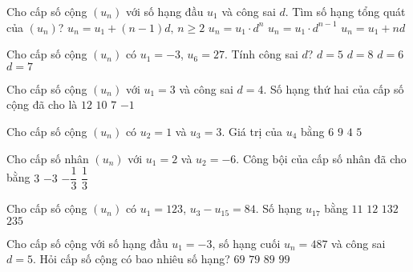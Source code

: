 \begin{ex}%
	Cho cấp số cộng $\left(u_n\right)$ với số hạng đầu $u_1$ và công sai $d$. Tìm số hạng tổng quát của $\left(u_n\right)$?
	\choice
		{\True  $u_n=u_1+\left( n-1 \right)d,\,n\ge 2$}
		{$u_n=u_1\cdot d^n$}
		{ $u_n=u_1\cdot d^{n-1}$}
		{$u_n=u_1+nd$}
\end{ex}
\begin{ex}%
	Cho cấp số cộng $\left(u_n\right)$ có $u_1=-3$, $u_6=27$. Tính công sai $d$?
	\choice
		{ $d=5$}
		{$d=8$}
		{\True $d=6$}
		{$d=7$}
\end{ex}
\begin{ex}%
	Cho cấp số cộng $\left(u_n\right)$ với $u_1=3$ và công sai $d=4$. Số hạng thứ hai của cấp số cộng đã cho là
	\choice
		{$12$}
		{$10$}
		{\True $7$}
		{$-1$}
\end{ex}
\begin{ex}%
	Cho cấp số cộng $\left(u_n\right)$ có $u_2=1$ và $u_3=3$. Giá trị của $u_4$ bằng
	\choice
		{ $6$}
		{$9$}
		{$4$}
		{\True $5$}
\end{ex}
\begin{ex}%
	Cho cấp số nhân $\left(u_n\right)$ với $u_1=2$ và $u_2=-6$. Công bội của cấp số nhân đã cho bằng
	\choice
		{$3$}
		{\True $-3$}
		{$-\dfrac{1}{3}$}
		{$\dfrac{1}{3}$}
\end{ex}
\begin{ex}%
	Cho cấp số cộng $\left(u_n\right)$ có $u_1=123$, $u_3-u_{15}=84$. Số hạng $u_{17}$ bằng
	\choice
		{\True  $11$}
		{$12$}
		{$132$ }
		{$235$}
\end{ex}
\begin{ex}%
	Cho cấp số cộng với số hạng đầu $u_1=-3$, số hạng cuối $u_n=487$ và công sai $d=5$. Hỏi cấp số cộng có bao nhiêu số hạng?
	\choice
		{$69$}
		{$79$}
		{$89$}
		{\True $99$}
\end{ex}
